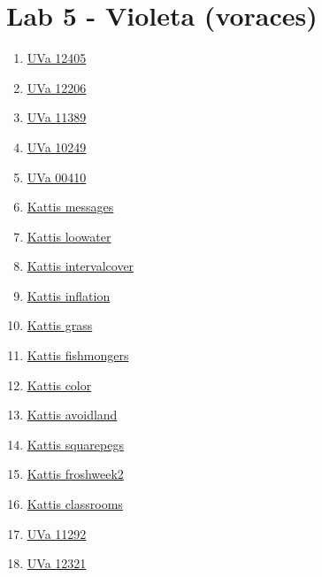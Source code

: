 \section{Lab 5 -  Violeta (voraces)}
        \begin{enumerate}
\item \href{https://onlinejudge.org/index.php?option=com_onlinejudge&Itemid=8&page=show_problem&problem=3836}{UVa 12405}
\item \href{https://onlinejudge.org/index.php?option=com_onlinejudge&Itemid=8&page=show_problem&problem=3358}{UVa 12206}
\item \href{https://onlinejudge.org/index.php?option=com_onlinejudge&Itemid=8&page=show_problem&problem=2384}{UVa 11389}
\item \href{https://onlinejudge.org/index.php?option=com_onlinejudge&Itemid=8&page=show_problem&problem=1190}{UVa 10249}
\item \href{https://onlinejudge.org/index.php?option=com_onlinejudge&Itemid=8&page=show_problem&problem=351}{UVa 00410}
\item \href{https://open.kattis.com/problems/messages}{Kattis messages}
\item \href{https://open.kattis.com/problems/loowater}{Kattis loowater}
\item \href{https://open.kattis.com/problems/intervalcover}{Kattis intervalcover}
\item \href{https://open.kattis.com/problems/inflation}{Kattis inflation}
\item \href{https://open.kattis.com/problems/grass}{Kattis grass}
\item \href{https://open.kattis.com/problems/fishmongers}{Kattis fishmongers}
\item \href{https://open.kattis.com/problems/color}{Kattis color}
\item \href{https://open.kattis.com/problems/avoidland}{Kattis avoidland}
\item \href{https://open.kattis.com/problems/squarepegs}{Kattis squarepegs}
\item \href{https://open.kattis.com/problems/froshweek2}{Kattis froshweek2}
\item \href{https://open.kattis.com/problems/classrooms}{Kattis classrooms}
\item \href{https://onlinejudge.org/index.php?option=com_onlinejudge&Itemid=8&page=show_problem&problem=2267}{UVa 11292}
\item \href{https://onlinejudge.org/index.php?option=com_onlinejudge&Itemid=8&page=show_problem&problem=3743}{UVa 12321}

\end{enumerate}
